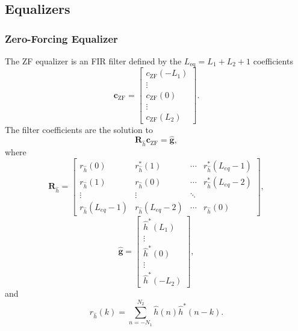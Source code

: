 \subsection{Equalizers}
\label{sec:equalizer_eq}

\subsubsection{Zero-Forcing Equalizer}
The ZF equalizer is an FIR filter defined by the $L_\text{eq}=L_1+L_2+1$ coefficients
\begin{equation}
\mathbf{c}_\text{ZF} = 
\begin{bmatrix}
c_\text{ZF}(-L_1) \\ \vdots \\ c_\text{ZF}(0) \\ \vdots \\ c_\text{ZF}(L_2)
\end{bmatrix}.
\end{equation}
The filter coefficients are the solution to \cite{paq-phase1-report:2014}
\begin{equation}
\mathbf{R}_{\hat{h}} \mathbf{c}_\text{ZF} = \hat{\mathbf{g}},
\label{eq:start_here_ZF_MDR}
\end{equation}
where
\begin{equation}
\mathbf{R}_{\hat{h}} = 
		\begin{bmatrix}
		r_{\hat{h}}(0)			& r^\ast_{\hat{h}}(1)	& \cdots 	& r^\ast_{\hat{h}}(L_{eq}-1)  	\\
		r_{\hat{h}}(1) 			& r_{\hat{h}}(0)		& \cdots 	& r^\ast_{\hat{h}}(L_{eq}-2)  	\\
		\vdots	 				& \vdots				& \ddots 	&  								\\
		r_{\hat{h}}(L_{eq}-1)	& r_{\hat{h}}(L_{eq}-2)	& \cdots	& r_{\hat{h}}(0)  			
	\end{bmatrix},
	\label{eq:R_h_MDR}
\end{equation}
\begin{equation}
\hat{\mathbf{g}} = 
\begin{bmatrix} \hat{h}^\ast(L_1) \\ \vdots \\ \hat{h}^\ast(0) \\ \vdots \\ \hat{h}^\ast(-L_2)  \end{bmatrix},
\label{eq:g_MDR}
\end{equation}
and
\begin{equation}
r_{\hat{h}}(k) = \sum_{n=-N_1}^{N_2} \hat{h}(n) \hat{h}^\ast(n-k).
\label{eq:sample_autocorrelation_ZF_MDR}
\end{equation}

